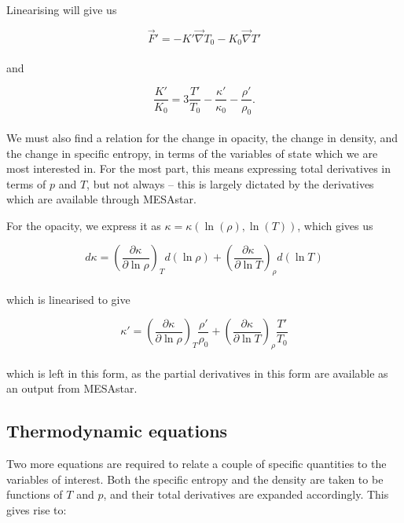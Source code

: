 \documentclass[11pt]{amsart}
\begin{document}
Linearising will give us

\begin{equation}
\vec{F}' = - K' \vec{\nabla} T_{0} - K_{0} \vec{\nabla} T'
\end{equation}
\\
and

\begin{equation}
\frac{K'}{K_{0}} = 3 \frac{T'}{T_{0}} - \frac{\kappa'}{\kappa_{0}} - \frac{\rho'}{\rho_{0}}.
\end{equation}
\\

We must also find a relation for the change in opacity, the change in density, and the change in specific entropy,
in terms of the variables of state which we are most interested in.  For the most part, this
means expressing total derivatives in terms of $p$ and $T$, but not always -- this is largely
dictated by the derivatives which are available through MESAstar.

For the opacity, we express it as $\kappa = \kappa \left( \ln (\rho) , \ln(T) \right)$, which gives us

\begin{equation}
d\kappa = \left( \frac{\partial \kappa}{\partial \ln \rho} \right)_{T} d(\ln \rho) + \left( \frac{\partial \kappa}{\partial \ln T} \right)_{\rho} d(\ln T)
\end{equation}
\\
which is linearised to give

\begin{equation}
\kappa' = \left( \frac{\partial \kappa}{\partial \ln \rho} \right)_{T} \frac{\rho'}{\rho_{0}} + \left( \frac{\partial \kappa}{\partial \ln T} \right)_{\rho} \frac{T'}{T_{0}}
\end{equation}
\\
which is left in this form, as the partial derivatives in this form are available as an output from MESAstar.



\subsection{Thermodynamic equations}

Two more equations are required to relate a couple of specific quantities to the variables of interest.
Both the specific entropy and the density are taken to be functions of $T$ and $p$, and their total derivatives
are expanded accordingly.  This gives rise to:
\end{document}
